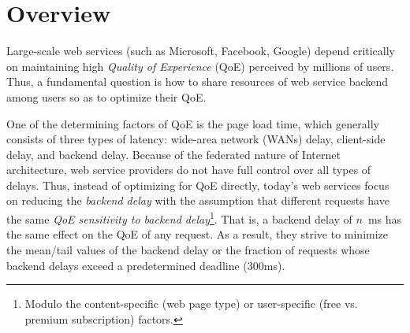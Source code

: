 \section{Overview}

Large-scale web services (such as Microsoft, Facebook, Google) depend critically on maintaining high {\em Quality of Experience} (QoE) perceived by millions of users. 
Thus, a fundamental question is how to share resources of web service backend among users so as to optimize their QoE. 

One of the determining factors of QoE is the page load time, which generally consists of three types of latency: wide-area network (WANs) delay, client-side delay, and backend delay.
Because of the federated nature of Internet architecture, web service providers do not have full control over all types of delays.
Thus, instead of optimizing for QoE directly, today's web services focus on reducing the {\em backend delay} with the assumption that different requests have the same {\em QoE sensitivity to backend delay}\footnote{Modulo the content-specific (\eg web page type) or user-specific (\eg free vs. premium subscription) factors.}.
That is, a backend delay of $n$~ms has the same effect on the QoE of any request.
As a result, they strive to minimize the mean/tail values of the backend delay or the fraction of requests whose backend delays exceed a predetermined deadline (\eg 300ms).

